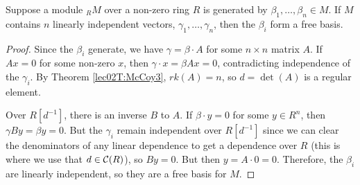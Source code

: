  \begin{corollary}
   Suppose a module ${}_RM$ over a non-zero ring $R$ is generated by $\beta_1,\dots,
   \beta_n\in M$. If $M$ contains $n$ linearly independent vectors, $\gamma_1,\dots,
   \gamma_n$, then the $\beta_i$ form a free basis.
 \end{corollary}
 \begin{proof}
   Since the $\beta_i$ generate, we have $\gamma = \beta\cdot A$ for some $n\times n$
   matrix $A$. If $Ax=0$ for some non-zero $x$, then $\gamma \cdot x = \beta Ax = 0$,
   contradicting independence of the $\gamma_i$. By Theorem \ref{lec02T:McCoy3},
   $rk(A)=n$, so $d=\det(A)$ is a regular element.

   Over $R[d^{-1}]$, there is an inverse $B$ to $A$. If $\beta\cdot
   y=0$ for some $y\in R^n$, then $\gamma By = \beta y=0$. But the $\gamma_i$ remain
   independent over $R[d^{-1}]$ since we can clear the denominators of any linear
   dependence to get a dependence over $R$ (this is where we use that $d\in \mathcal{C}(R)$), so
   $By=0$. But then $y=A\cdot 0 = 0$. Therefore, the $\beta_i$ are linearly independent,
   so they are a free basis for $M$.
%
%
%
 \end{proof}
